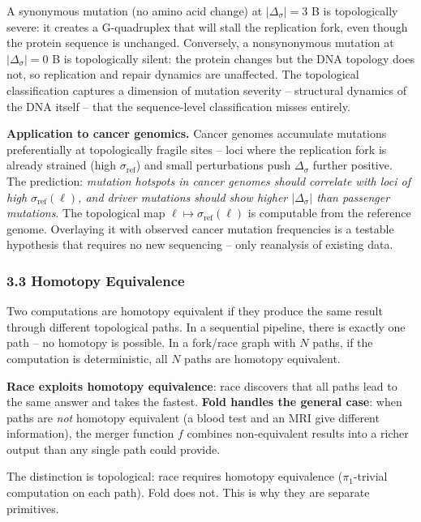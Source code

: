 \documentclass[
  11pt,
]{article}
\begin{document}
A synonymous mutation (no amino acid change) at \(|\Delta_\sigma| = 3\)
B is topologically severe: it creates a G-quadruplex that will stall the
replication fork, even though the protein sequence is unchanged.
Conversely, a nonsynonymous mutation at \(|\Delta_\sigma| = 0\) B is
topologically silent: the protein changes but the DNA topology does not,
so replication and repair dynamics are unaffected. The topological
classification captures a dimension of mutation severity -- structural
dynamics of the DNA itself -- that the sequence-level classification
misses entirely.

\textbf{Application to cancer genomics.} Cancer genomes accumulate
mutations preferentially at topologically fragile sites -- loci where
the replication fork is already strained (high \(\sigma_{\text{ref}}\))
and small perturbations push \(\Delta_\sigma\) further positive. The
prediction: \emph{mutation hotspots in cancer genomes should correlate
with loci of high \(\sigma_{\text{ref}}(\ell)\), and driver mutations
should show higher \(|\Delta_\sigma|\) than passenger mutations}. The
topological map \(\ell \mapsto \sigma_{\text{ref}}(\ell)\) is computable
from the reference genome. Overlaying it with observed cancer mutation
frequencies is a testable hypothesis that requires no new sequencing --
only reanalysis of existing data.

\subsubsection{3.3 Homotopy Equivalence}\label{homotopy-equivalence}

Two computations are homotopy equivalent if they produce the same result
through different topological paths. In a sequential pipeline, there is
exactly one path -- no homotopy is possible. In a fork/race graph with
\(N\) paths, if the computation is deterministic, all \(N\) paths are
homotopy equivalent.

\textbf{Race exploits homotopy equivalence}: race discovers that all
paths lead to the same answer and takes the fastest. \textbf{Fold
handles the general case}: when paths are \emph{not} homotopy equivalent
(a blood test and an MRI give different information), the merger
function \(f\) combines non-equivalent results into a richer output than
any single path could provide.

The distinction is topological: race requires homotopy equivalence
(\(\pi_1\)-trivial computation on each path). Fold does not. This is why
they are separate primitives.
\end{document}
